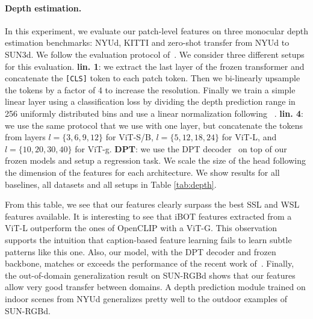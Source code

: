 \paragraph{Depth estimation.}
In this experiment, we evaluate our patch-level features on three monocular depth estimation benchmarks: NYUd, KITTI and zero-shot transfer from NYUd to SUN3d.
We follow the evaluation protocol of~\citet{li2022binsformer}.
We consider three different setups for this evaluation.
\textbf{lin. 1}: we extract the last layer of the frozen transformer and concatenate the \texttt{[CLS]} token to each patch token. 
Then we bi-linearly upsample the tokens by a factor of 4 to increase the resolution. 
Finally we train a simple linear layer using a classification loss by dividing the depth prediction range in 256 uniformly distributed bins and use a linear normalization following ~\cite{bhat2019adabins}.
\textbf{lin. 4}: we use the same protocol that we use with one layer, but concatenate the tokens from layers $l=\{3,6,9,12\}$ for ViT-S/B, $l=\{5,12,18,24\}$ for ViT-L, and $l=\{10, 20, 30, 40\}$ for ViT-g.
\textbf{DPT}: we use the DPT decoder~\citep{ranftl2021vision} on top of our frozen models and setup a regression task. 
We scale the size of the head following the dimension of the features for each architecture. 
We show results for all baselines, all datasets and all setups in Table \ref{tab:depth}.

From this table, we see that our features clearly surpass the best SSL and WSL features available.
It is interesting to see that iBOT features extracted from a ViT-L outperform the ones of OpenCLIP with a ViT-G.
This observation supports the intuition that caption-based feature learning fails to learn subtle patterns like this one.
Also, our model, with the DPT decoder and frozen backbone, matches or exceeds the performance of the recent work of~\citet{li2022binsformer}.
Finally, the out-of-domain generalization result on SUN-RGBd shows that our features allow very good transfer between domains. 
A depth prediction module trained on indoor scenes from NYUd generalizes pretty well to the outdoor examples of SUN-RGBd.

